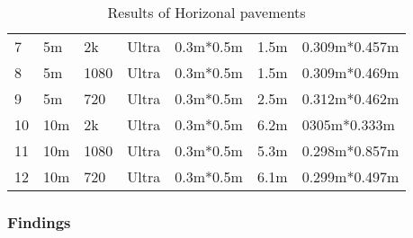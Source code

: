\begin{table}[]
\begin{tabular}{lllllll}
  7   & 5m                                                & 2k                                                     & Ultra                                            & 0.3m*0.5m                                                & 1.5m                                                          & 0.309m*0.457m                                      \\
  8   & 5m                                                & 1080                                                   & Ultra                                            & 0.3m*0.5m                                                & 1.5m                                                          & 0.309m*0.469m                                      \\
  9   & 5m                                                & 720                                                    & Ultra                                            & 0.3m*0.5m                                                & 2.5m                                                          & 0.312m*0.462m                                      \\
  10  & 10m                                               & 2k                                                     & Ultra                                            & 0.3m*0.5m                                                & 6.2m                                                          & 0305m*0.333m                                       \\
  11  & 10m                                               & 1080                                                   & Ultra                                            & 0.3m*0.5m                                                & 5.3m                                                          & 0.298m*0.857m                                      \\
  12  & 10m                                               & 720                                                    & Ultra                                            & 0.3m*0.5m                                                & 6.1m                                                          & 0.299m*0.497m                                     
  \end{tabular}
  \caption{Results of Horizonal pavements}
  \label{fig:Horizonal pavements}
  \end{table}

\subsubsection{Findings}

